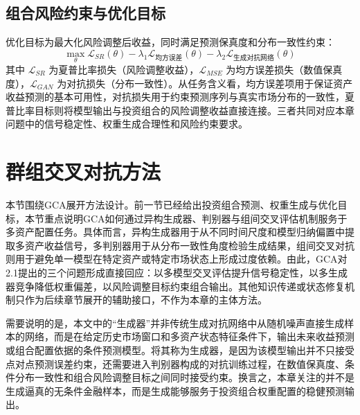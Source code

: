 \subsection{组合风险约束与优化目标}

优化目标为最大化风险调整后收益，同时满足预测保真度和分布一致性约束：
\[
\max_{\theta} \mathcal{L}_{SR}(\theta) - \lambda_1 \mathcal{L}_{均方误差}(\theta) - \lambda_2 \mathcal{L}_{生成对抗网络}(\theta)
\]
其中 $\mathcal{L}_{SR}$ 为夏普比率损失（风险调整收益），$\mathcal{L}_{MSE}$ 为均方误差损失（数值保真度），$\mathcal{L}_{GAN}$ 为对抗损失（分布一致性）。从任务含义看，均方误差项用于保证资产收益预测的基本可用性，对抗损失用于约束预测序列与真实市场分布的一致性，夏普比率目标则将模型输出与投资组合的风险调整收益直接连接。三者共同对应本章问题中的信号稳定性、权重生成合理性和风险约束要求。



\section{群组交叉对抗方法}

本节围绕GCA展开方法设计。前一节已经给出投资组合预测、权重生成与优化目标，本节重点说明GCA如何通过异构生成器、判别器与组间交叉评估机制服务于多资产配置任务。具体而言，异构生成器用于从不同时间尺度和模型归纳偏置中提取多资产收益信号，多判别器用于从分布一致性角度检验生成结果，组间交叉对抗则用于避免单一模型在特定资产或特定市场状态上形成过度依赖。由此，GCA对2.1提出的三个问题形成直接回应：以多模型交叉评估提升信号稳定性，以多生成器竞争降低权重偏差，以风险调整目标约束组合输出。其他知识传递或状态修复机制只作为后续章节展开的辅助接口，不作为本章的主体方法。

需要说明的是，本文中的“生成器”并非传统生成对抗网络中从随机噪声直接生成样本的网络，而是在给定历史市场窗口和多资产状态特征条件下，输出未来收益预测或组合配置依据的条件预测模型。将其称为生成器，是因为该模型输出并不只接受点对点预测误差约束，还需要进入判别器构成的对抗训练过程，在数值保真度、条件分布一致性和组合风险调整目标之间同时接受约束。换言之，本章关注的并不是生成逼真的无条件金融样本，而是生成能够服务于投资组合权重配置的稳健预测输出。



